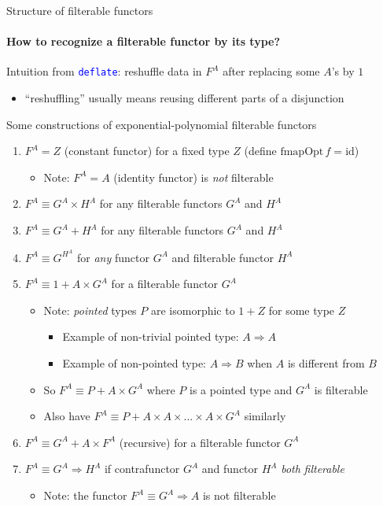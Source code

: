 \documentclass[english]{beamer}
\begin{document}
\begin{frame}{Structure of filterable functors}


\framesubtitle{How to recognize a filterable functor by its type?}

Intuition from \texttt{\textcolor{blue}{\footnotesize{}deflate}}:
reshuffle data in $F^{A}$ after replacing some $A$'s by $1$
\begin{itemize}
\item ``reshuffling'' usually means reusing different parts of a disjunction
\end{itemize}
Some constructions of exponential-polynomial filterable functors 
\begin{enumerate}
\item $F^{A}=Z$ (constant functor) for a fixed type $Z$ (define $\text{fmapOpt}\,f=\text{id}$)
\begin{itemize}
\item Note: $F^{A}=A$ (identity functor) is \emph{not} filterable
\end{itemize}
\item $F^{A}\equiv G^{A}\times H^{A}$ for any filterable functors $G^{A}$
and $H^{A}$
\item $F^{A}\equiv G^{A}+H^{A}$ for any filterable functors $G^{A}$ and
$H^{A}$
\item $F^{A}\equiv G^{H^{A}}$ for \emph{any} functor $G^{A}$ and filterable
functor $H^{A}$
\item $F^{A}\equiv1+A\times G^{A}$ for a filterable functor $G^{A}$
\begin{itemize}
\item Note: \emph{pointed} types $P$ are isomorphic to $1+Z$ for some
type $Z$
\begin{itemize}
\item Example of non-trivial pointed type: $A\Rightarrow A$
\item Example of non-pointed type: $A\Rightarrow B$ when $A$ is different
from $B$
\end{itemize}
\item So $F^{A}\equiv P+A\times G^{A}$ where $P$ is a pointed type and
$G^{A}$ is filterable
\item Also have $F^{A}\equiv P+A\times A\times...\times A\times G^{A}$
similarly
\end{itemize}
\item $F^{A}\equiv G^{A}+A\times F^{A}$ (recursive) for a filterable functor
$G^{A}$
\item $F^{A}\equiv G^{A}\Rightarrow H^{A}$ if\emph{ }contrafunctor $G^{A}$
and functor $H^{A}$ \emph{both} \emph{filterable}
\begin{itemize}
\item Note: the functor $F^{A}\equiv G^{A}\Rightarrow A$ is not filterable
\end{itemize}
\end{enumerate}
\end{frame}
\end{document}
